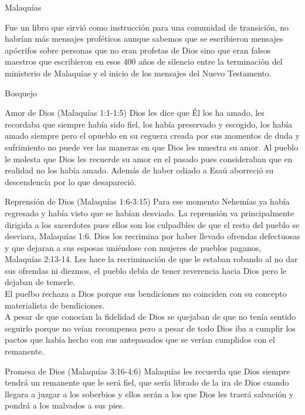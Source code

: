 \begin{section}{Malaquías}
\begin{enumerate}
			Fue un libro que sirvió como instrucción para una comunidad de transición, no habrían más mensajes proféticos aunque sabemos que se escribieron mensajes apócrifos sobre personas que no eran profetas de Dios sino que eran falsos maestros que escribieron en esos 400 años de silencio entre la terminación del ministerio de Malaquías y el inicio de los mensajes del Nuevo Testamento.
	\end{enumerate}
	\begin{subsection}{Bosquejo}
		\begin{subsubsection}{Amor de Dios (Malaquías 1:1-1:5)}
			Dios les dice que Él los ha amado, les recordaba que siempre había sido fiel, los había preservado y escogido, los había amado siempre pero el opueblo en su ceguera creada por sus momentos de duda y sufrimiento no puede ver las maneras en que Dios les muestra su amor. Al pueblo le molesta que Dios les recuerde su amor en el pasado pues consideraban que en realidad no los había amado. Además de haber odiado a Esaú aborreció su descendencia por lo que desapareció.
		\end{subsubsection}
		\begin{subsubsection}{Reprensión de Dios (Malaquías 1:6-3:15)}
			Para ese momento Nehemías ya había regresado y había visto que se habían desviado. La reprensión va principalmente dirigida a los sacerdotes pues ellos son los culpadbles de que el resto del pueblo se desviara, Malaquías 1:6. Dios los recrimina por haber llevado ofrendas defectuosas y que dejaran a sus esposas uniéndose con mujeres de pueblos paganos, Malaquías 2:13-14. Les hace la recriminación de que le estaban robando al no dar sus ofrendas ni diezmos, el pueblo debía de tener reverencia hacia Dios pero le dejaban de temerle.\\
			El puelbo rechaza a Dios porque sus bendiciones no coinciden con su concepto materialista de bendiciones.\\
			A pesar de que conocían la fidelidad de Dios se quejaban de que no tenía sentido seguirlo porque no veían recompensa pero a pesar de todo Dios iba a cumplir los pactos que había hecho con sus antepasados que se verían cumplidos con el remanente.
		\end{subsubsection}
		\begin{subsubsection}{Promesa de Dios (Malaquías 3:16-4:6)}
			Malaquías les recuerda que Dios siempre tendrá un remanente que le será fiel, que sería librado de la ira de Dios cuando llegara a juzgar a los soberbios y ellos serán a los que Dios les traerá salvación y pondrá a los malvados a sus pies.\\

\end{subsubsection}
\end{subsection}
\end{section}
